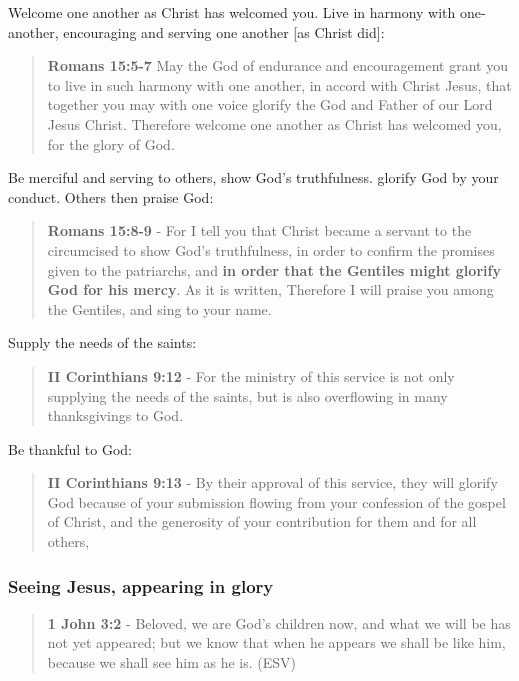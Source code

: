 \documentclass[11pt]{article}
\begin{document}
Welcome one another as Christ has welcomed you. Live in harmony with one-another, encouraging and serving one another [as Christ did]:

\begin{quote}
\textbf{Romans 15:5-7} May the God of endurance and encouragement grant you to live in such harmony with one another, in accord with Christ Jesus, that together you may with one voice glorify the God and Father of our Lord Jesus Christ. Therefore welcome one another as Christ has welcomed you, for the glory of God.
\end{quote}

Be merciful and serving to others, show God's truthfulness. glorify God by your conduct. Others then praise God:

\begin{quote}
\textbf{Romans 15:8-9} - For I tell you that Christ became a servant to the circumcised to show God's truthfulness, in order to confirm the promises given to the patriarchs, and \textbf{in order that the Gentiles might glorify God for his mercy}. As it is written, Therefore I will praise you among the Gentiles, and sing to your name.
\end{quote}

Supply the needs of the saints:

\begin{quote}
\textbf{II Corinthians 9:12} - For the ministry of this service is not only supplying the needs of the saints, but is also overflowing in many thanksgivings to God.
\end{quote}

Be thankful to God:

\begin{quote}
\textbf{II Corinthians 9:13} - By their approval of this service, they will glorify God because of your submission flowing from your confession of the gospel of Christ, and the generosity of your contribution for them and for all others,
\end{quote}

\subsubsection{Seeing Jesus, appearing in glory}
\label{sec:orgcb2a6bc}
\begin{quote}
\textbf{1 John 3:2} -  Beloved, we are God's children now, and what we will be has not yet appeared; but we know that when he appears we shall be like him, because we shall see him as he is.  (ESV)
\end{quote}
\end{document}
